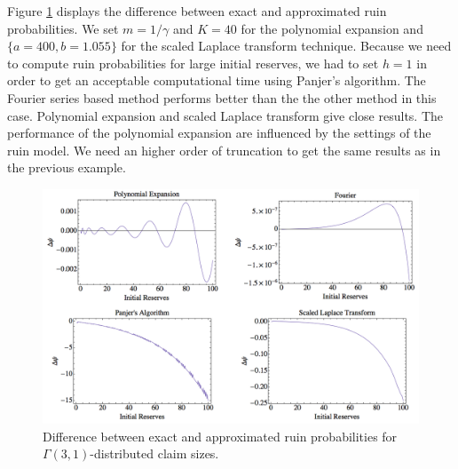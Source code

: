 Figure \ref{Gamma3CaseDifferentMethods} displays the difference between exact and approximated ruin probabilities. We set $m=1/\gamma$ and $K=40$ for the polynomial expansion and $\{a=400,b=1.055\}$ for the scaled Laplace transform technique. Because we need to compute ruin probabilities for large initial reserves, we had to set $h=1$ in order to get an acceptable computational time using Panjer\rq{}s algorithm. The Fourier series based method performs better than the the other method in this case. Polynomial expansion and scaled Laplace transform give close results. The performance of the polynomial expansion are influenced by the settings of the ruin model. We need an higher order of truncation to get the same results as in the previous example.

\begin{center}
	\begin{figure}[!h]
		\begin{center}
			\includegraphics[width=16cm]{Chapitre4/GraphUltimateRuinProbabilityGamma3-1Case.png}
			\caption{Difference between exact and approximated ruin probabilities for $\Gamma(3,1)$-distributed claim sizes.}\label{Gamma3CaseDifferentMethods}
		\end{center}
	\end{figure}
\end{center}
